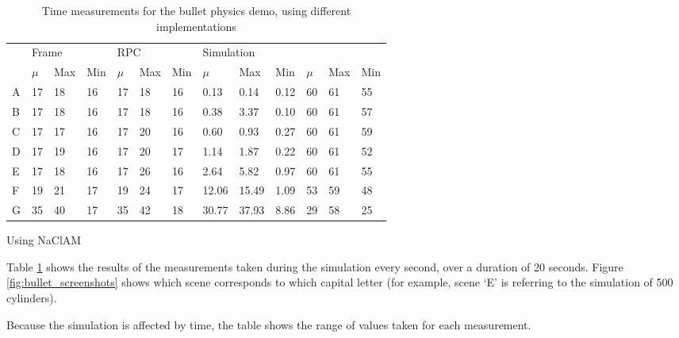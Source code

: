 \begin{table}[h]
\begin{subtable}[h]{\textwidth}
\begin{tabular}{l|lll|lll|lll|lll}
                       & \multicolumn{3}{l|}{Frame} & \multicolumn{3}{l|}{RPC} & \multicolumn{3}{l|}{Simulation} & \multicolumn{3}{l|}{}                     \\ \cline{2-13} 
                       & $\mu$     & Max     & Min     & $\mu$     & Max    & Min    & $\mu$       & Max       & Min      & $\mu$          & Max          & Min          \\ \hline
A                      & 17       & 18     & 16     & 17       & 18    & 16    & 0.13       & 0.14     & 0.12    & 60            & 61          & 55          \\
B                      & 17       & 18     & 16     & 17       & 18    & 16    & 0.38       & 3.37     & 0.10    & 60            & 61          & 57          \\
C                      & 17       & 17     & 16     & 17       & 20    & 16    & 0.60       & 0.93     & 0.27    & 60            & 61          & 59          \\
D                      & 17       & 19     & 16     & 17       & 20    & 17    & 1.14       & 1.87     & 0.22    & 60            & 61          & 52          \\
E                      & 17       & 18     & 16     & 17       & 26    & 16    & 2.64       & 5.82     & 0.97    & 60            & 61          & 55          \\
F                      & 19       & 21     & 17     & 19       & 24    & 17    & 12.06      & 15.49    & 1.09    & 53            & 59          & 48          \\
G                      & 35       & 40     & 17     & 35       & 42    & 18    & 30.77      & 37.93    & 8.86    & 29            & 58          & 25         
\end{tabular}
        \caption{Using NaClAM}
    \end{subtable}
\caption{Time measurements for the bullet physics demo, using different implementations}
\label{table:bullet_performance}
\end{table}


Table \ref{table:bullet_performance} shows the results of the measurements taken during the simulation every second, over a duration of 20 seconds. Figure \ref{fig:bullet_screenshots} shows which scene corresponds to which capital letter (for example, scene `E' is referring to the simulation of 500 cylinders).

Because the simulation is affected by time, the table shows the range of values taken for each measurement.

